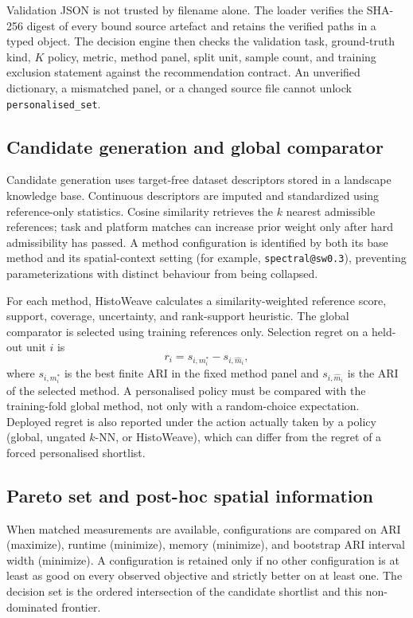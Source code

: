 \documentclass[12pt]{article}
\newcommand{\software}{HistoWeave}
\begin{document}
Validation JSON is not trusted by filename alone. The loader verifies the
SHA-256 digest of every bound source artefact and retains the verified paths
in a typed object. The decision engine then checks the validation task,
ground-truth kind, \(K\) policy, metric, method panel, split unit, sample
count, and training exclusion statement against the recommendation contract.
An unverified dictionary, a mismatched panel, or a changed source file cannot
unlock \texttt{personalised\_set}.

\subsection{Candidate generation and global comparator}

Candidate generation uses target-free dataset descriptors stored in a
landscape knowledge base. Continuous descriptors are imputed and standardized
using reference-only statistics. Cosine similarity retrieves the \(k\)
nearest admissible references; task and platform matches can increase prior
weight only after hard admissibility has passed. A method configuration is
identified by both its base method and its spatial-context setting (for
example, \texttt{spectral@sw0.3}), preventing parameterizations with distinct
behaviour from being collapsed.

For each method, \software{} calculates a similarity-weighted reference score,
support, coverage, uncertainty, and rank-support heuristic. The global
comparator is selected using training references only. Selection regret on a
held-out unit \(i\) is
\[
  r_i = s_{i,m_i^\ast} - s_{i,\widehat m_i},
\]
where \(s_{i,m_i^\ast}\) is the best finite ARI in the fixed method panel and
\(s_{i,\widehat m_i}\) is the ARI of the selected method. A personalised
policy must be compared with the training-fold global method, not only with a
random-choice expectation. Deployed regret is also reported under the action
actually taken by a policy (global, ungated \(k\)-NN, or \software{}), which
can differ from the regret of a forced personalised shortlist.

\subsection{Pareto set and post-hoc spatial information}

When matched measurements are available, configurations are compared on ARI
(maximize), runtime (minimize), memory (minimize), and bootstrap ARI interval
width (minimize). A configuration is retained only if no other configuration
is at least as good on every observed objective and strictly better on at
least one. The decision set is the ordered intersection of the candidate
shortlist and this non-dominated frontier.
\end{document}
